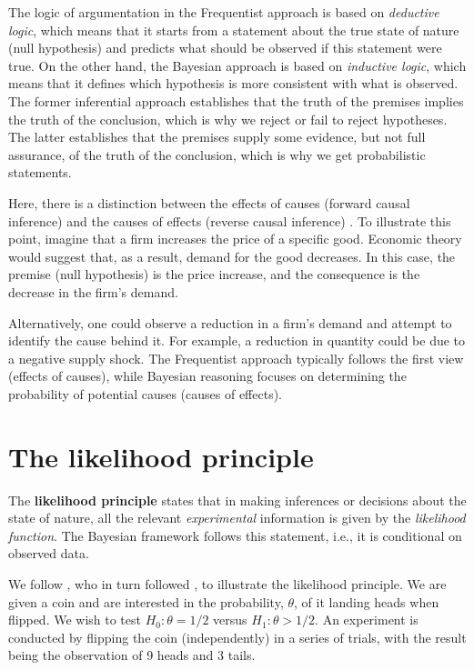 The logic of argumentation in the Frequentist approach is based on \textit{deductive logic}, which means that it starts from a statement about the true state of nature (null hypothesis) and predicts what should be observed if this statement were true. On the other hand, the Bayesian approach is based on \textit{inductive logic}, which means that it defines which hypothesis is more consistent with what is observed. The former inferential approach establishes that the truth of the premises implies the truth of the conclusion, which is why we reject or fail to reject hypotheses. The latter establishes that the premises supply some evidence, but not full assurance, of the truth of the conclusion, which is why we get probabilistic statements.

Here, there is a distinction between the effects of causes (forward causal inference) and the causes of effects (reverse causal inference) \cite{Gelman2013, Dawid2016}. To illustrate this point, imagine that a firm increases the price of a specific good. Economic theory would suggest that, as a result, demand for the good decreases. In this case, the premise (null hypothesis) is the price increase, and the consequence is the decrease in the firm's demand.

Alternatively, one could observe a reduction in a firm's demand and attempt to identify the cause behind it. For example, a reduction in quantity could be due to a negative supply shock. The Frequentist approach typically follows the first view (effects of causes), while Bayesian reasoning focuses on determining the probability of potential causes (causes of effects).

\section{The likelihood principle}\label{sec24} 

The \textbf{likelihood principle} states that in making inferences or decisions about the state of nature, all the relevant \textit{experimental} information is given by the \textit{likelihood function}. The Bayesian framework follows this statement, i.e., it is conditional on observed data.

We follow \cite{berger93}, who in turn followed \cite{Lindley76}, to illustrate the likelihood principle. We are given a coin and are interested in the probability, $\theta$, of it landing heads when flipped. We wish to test $H_0: \theta = 1/2$ versus $H_1: \theta > 1/2$. An experiment is conducted by flipping the coin (independently) in a series of trials, with the result being the observation of 9 heads and 3 tails.

